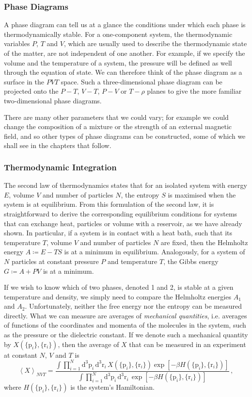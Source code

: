 \documentclass{article}
\theoremstyle{plain}\theoremheaderfont{\normalfont\bfseries}\theorembodyfont{\rmfamily}\theoremseparator{.}\newtheorem*{thm}{Theorem}\newtheorem*{law}{Law}\newtheorem*{pos}{Postulate}
\numberwithin{equation}{section}
\newcommand{\dd}[2][]{\mathrm{d}^{#1} #2\,}
\newcommand{\eval}[1]{\left\langle #1 \right\rangle}
\newcommand{\vb}[1]{\bm{\mathrm{#1}}}
\begin{document}
    \subsubsection{Phase Diagrams}
    A phase diagram can tell us at a glance the conditions under which each phase is thermodynamically stable. For a one-component system, the thermodynamic variables \(P\), \(T\) and \(V\), which are usually used to describe the thermodynamic state of the matter, are not independent of one another. For example, if we specify the volume and the temperature of a system, the pressure will be defined as well through the equation of state. We can therefore think of the phase diagram as a surface in the \(PVT\) space. Such a three-dimensional phase diagram can be projected onto the \(P-T\), \(V-T\), \(P-V\) or \(T-\rho\) planes to give the more familiar two-dimensional phase diagrams.

    There are many other parameters that we could vary; for example we could change the composition of a mixture or the strength of an external magnetic field, and so other types of phase diagrams can be constructed, some of which we shall see in the chapters that follow.
    \subsubsection{Thermodynamic Integration}
    The second law of thermodynamics states that for an isolated system with energy \(E\), volume \(V\) and number of particles \(N\), the entropy \(S\) is maximised when the system is at equilibrium. From this formulation of the second law, it is straightforward to derive the corresponding equilibrium conditions for systems that can exchange heat, particles or volume with a reservoir, as we have already shown. In particular, if a system is in contact with a heat bath, such that its temperature \(T\), volume \(V\) and number of particles \(N\) are fixed, then the Helmholtz energy \(A\coloneqq E-TS\) is at a minimum in equilibrium. Analogously, for a system of \(N\) particles at constant pressure \(P\) and temperature \(T\), the Gibbs energy \(G\coloneqq A+PV\) is at a minimum.

    If we wish to know which of two phases, denoted 1 and 2, is stable at a given temperature and density, we simply need to compare the Helmholtz energies \(A_1\) and \(A_2\). Unfortunately, neither the free energy nor the entropy can be measured directly. What we can measure are averages of \textit{mechanical quantities}, i.e. averages of functions of the coordinates and momenta of the molecules in the system, such as the pressure or the dielectric constant. If we denote such a mechanical quantity by \(X(\{\vb{p}_i\},\{\vb{r}_i\})\), then the average of \(X\) that can be measured in an experiment at constant \(N\), \(V\) and \(T\) is
    \begin{equation}
        \eval{X}_{NVT}=\frac{\int\prod_{i=1}^{N}\dd[3]{\vb{p}_i}\dd[3]{\vb{r}_i}X(\{\vb{p}_i\},\{\vb{r}_i\})\exp[-\beta H(\{\vb{p}_i\},\{\vb{r}_i\})]}{\int\prod_{i=1}^{N}\dd[3]{\vb{p}_i}\dd[3]{\vb{r}_i}\exp[-\beta H(\{\vb{p}_i\},\{\vb{r}_i\})]}\,,
    \end{equation}
    where \(H(\{\vb{p}_i\},\{\vb{r}_i\})\) is the system's Hamiltonian.
\end{document}
